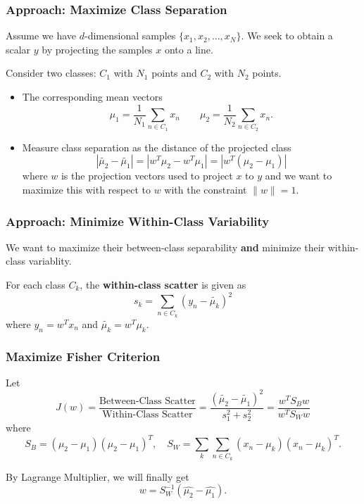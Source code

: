 \documentclass[aspectratio = 169]{beamer}
\begin{document}
\begin{frame}

\frametitle{Approach: Maximize Class Separation}

Assume we have $d$-dimensional samples $\{x_1, x_2, \ldots, x_N \}$. We seek to obtain a scalar $y$ by projecting the samples $x$ onto a line. 

\vspace{0.4cm}


Consider two classes: $C_1$ with $N_1$ points and $C_2$ with $N_2$ points.


\begin{itemize}

	\item The corresponding mean vectors  
	$$
	\mu_1 = \frac{1}{N_1} \sum_{n \in C_1} x_n \qquad \mu_2 = \frac{1}{N_2} \sum_{n \in C_2} x_n.
	$$


	\item Measure class separation as the distance of the projected class 
	$$
	\left|\tilde{\mu_2} - \tilde{\mu_1} \right| = \left|w^T \mu_2 - w^T \mu_1 \right| = \left|w^T (\mu_2 - \mu_1) \right|
	$$
	where $w$ is the projection vectors used to project $x$ to $y$ and we want to maximize this with respect to $w$ with the constraint $\|w \| = 1$.


\end{itemize}

\end{frame}

\begin{frame}

\frametitle{Approach: Minimize Within-Class Variability}

We want to maximize their between-class separability \textbf{and} minimize their within-class variablity.

\vspace{0.4cm}


For each class $C_k$, the \textbf{within-class scatter} is given as 
$$
s_k = \sum_{n \in C_k} (y_n - \tilde{\mu_k})^2
$$
where $y_n = w^T x_n$ and $\tilde{\mu_k} = w^T \mu_k$.


\end{frame}

\begin{frame}

\frametitle{Maximize Fisher Criterion}

Let 
$$
J(w) = \frac{\text{Between-Class Scatter}}{\text{Within-Class Scatter}} = \frac{\left(\tilde{\mu_2} - \tilde{\mu_1} \right)^2}{s_1^2 + s_2^2} = \frac{w^T S_B w}{w^T S_W w}
$$
where 
$$
S_B = (\mu_2 - \mu_1) (\mu_2 - \mu_1)^T, \quad S_W = \sum_k \sum_{n \in C_k} (x_n - \mu_k)(x_n - \mu_k)^T.
$$


By Lagrange Multiplier, we will finally get 
$$
w = S_W^{-1} \left(\hat{\mu_2} - \hat{\mu_1} \right).
$$

\end{frame}
\end{document}

